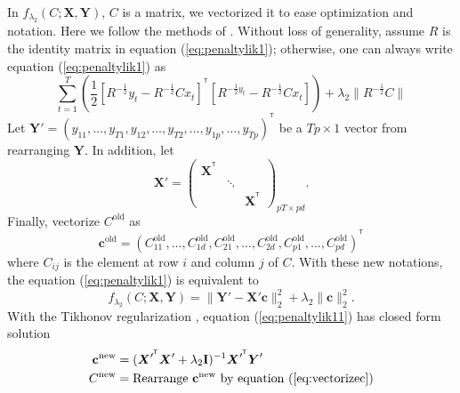 \documentclass[fleqn,12pt]{article}
\let\oldref\ref
\renewcommand{\ref}[1]{(\oldref{#1})}
\newcommand{\T}{^{\ensuremath{\mathsf{T}}}}           %
\providecommand{\mb}[1]{\boldsymbol{#1}}
\newcommand{\bx}{\mb{x}}
\newcommand{\bX}{\mb{X}}
\newcommand{\bY}{\mb{Y}}
\begin{document}
In $f_{\lambda_2}(C;\bX,\bY)$, $C$ is a matrix, we vectorized it to ease optimization and notation. Here we follow the methods of \citet{turlach2005simultaneous}. Without loss of generality, assume $R$ is the identity matrix in equation \ref{eq:penaltylik1}; otherwise, one can always write equation \ref{eq:penaltylik1} as
\begin{equation*}
\sum\limits_{t=1}^{T}\left(\frac{1}{2}[R^{-\frac{1}{2}}y_t-R^{-\frac{1}{2}}Cx_t]^{\T}[R^{-\frac{1}{2}y_t}-R^{-\frac{1}{2}}Cx_t]\right) + \lambda_2 \|R^{-\frac{1}{2}}C\|
\end{equation*}
Let $\bY' = (y_{11},\ldots,y_{T1},y_{12},\ldots,y_{T2},\ldots,y_{1p},\ldots,y_{Tp})^{\T}$
be a $Tp\times 1$ vector from rearranging  $\bY$. In addition, let
\[
\bX' = \begin{pmatrix}
\bX^{\T}&&\\
&\ddots&\\
&&\bX^{\T}
\end{pmatrix}_{pT\times pd}.
\]
Finally, vectorize $C^{\text{old}}$ as
\begin{equation}\label{eq:vectorizec}
\mathbf{c}^{\text{old}} = (C_{11}^{\text{old}},\ldots,C_{1d}^{\text{old}},C_{21}^{\text{old}},\ldots,C_{2d}^{\text{old}},C_{p1}^{\text{old}},\ldots,C_{pd}^{\text{old}})^{\T}
\end{equation}
where $C_{ij}$ is the element at row $i$ and column $j$ of $C$. With these new notations, the equation \ref{eq:penaltylik1} is equivalent to
\begin{equation}\label{eq:penaltylik11}
f_{\lambda_2}(C;\bX,\bY) = \|\bY'  - \mathbf{X' c}\|_2^2 + \lambda_2\|\mathbf{c}\|_2^2.
\end{equation}
With the Tikhonov regularization \citep{tikhonov1943stability}, equation \ref{eq:penaltylik11} has closed form solution
\begin{equation}\label{eq:updatec}
\begin{aligned}
\mathbf{c}^{\text{new}} &= (\bX'^{\T}\bX' + \lambda_2\mathbf{I})^{-1}\bX'^{\T}\bY'\\
C^{\text{new}} &=\text{Rearrange } \mathbf{c}^{\text{new}} \text{ by equation }\ref{eq:vectorizec}
\end{aligned}
\end{equation}
\end{document}
